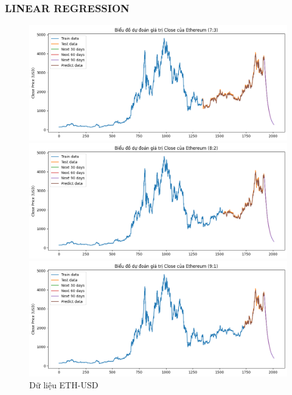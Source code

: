 \documentclass[conference]{IEEEtran}
\begin{document}
\subsubsection{LINEAR REGRESSION}
\begin{figure}[H]
    \centering
    \begin{minipage}{0.15\textwidth}
    \centering
    \includegraphics[width=1\textwidth]{Figure/ETH_73.png}
    \end{minipage}
    \hfill
    \begin{minipage}{0.15\textwidth}
    \centering
    \includegraphics[width=1\textwidth]{Figure/ETH_82.png}
    \end{minipage}
    \hfill
    \begin{minipage}{0.15\textwidth}
    \centering
    \includegraphics[width=1\textwidth]{Figure/ETH_91.png}
    \end{minipage}
    \caption{Dữ liệu ETH-USD}
    \label{fig:1}
\end{figure}
\end{document}
